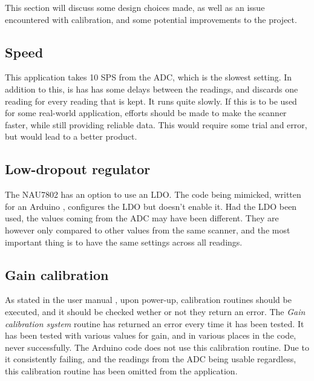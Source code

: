 \documentclass[12pt, a4paper]{article}
\begin{document}
            This section will discuss some design choices made, as well as an issue encountered with calibration,
            and some potential improvements to the project.
        
        \subsection{Speed}
            
            This application takes 10 SPS from the ADC, which is the slowest setting. In addition to this, is has has some delays between the readings, and
            discards one reading for every reading that is kept. It runs quite slowly. If this is to be used for some real-world
            application, efforts should be made to make the scanner faster, while still providing reliable data. This would require
            some trial and error, but would lead to a better product.

        \subsection{Low-dropout regulator}

            The NAU7802 has an option to use an LDO. 
            The code being mimicked, written for an Arduino \cite{arduinocode}, configures the LDO but
            doesn't enable it. Had the LDO been used, the values coming from the ADC may have been different. They are
            however only compared to other values from the same scanner, and the most important thing is to have the same settings
            across all readings.

        \subsection{Gain calibration}

            As stated in the user manual \cite{nau}, upon power-up, calibration routines should be executed, and it should be
            checked wether or not they return an error. The \textit{Gain calibration system} routine has returned an error every time
            it has been tested. It has been tested with various values for gain, and in various places in the code, never successfully.
            The Arduino code \cite{arduinocode} does not use this calibration routine. Due to it consistently failing, and the readings
            from the ADC being usable regardless, this calibration routine has been omitted from the application.
\end{document}
